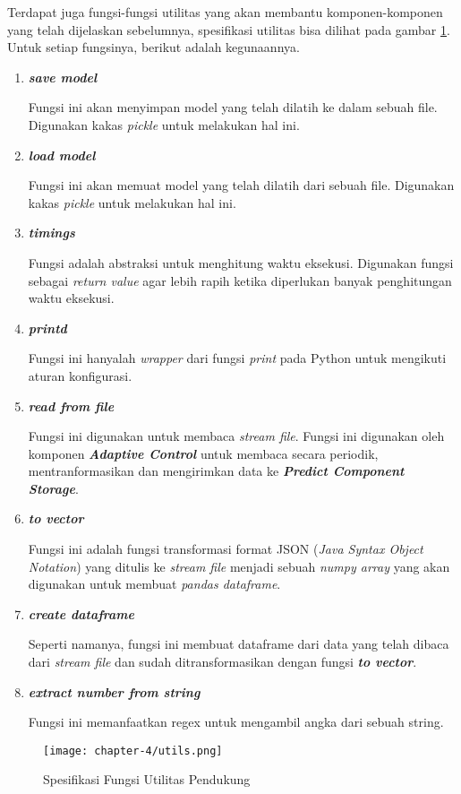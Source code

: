 Terdapat juga fungsi-fungsi utilitas yang akan membantu komponen-komponen yang telah dijelaskan sebelumnya, spesifikasi utilitas bisa dilihat pada gambar \ref{fig:util-spek}. Untuk setiap fungsinya, berikut adalah kegunaannya.

\begin{enumerate}
    \item \textbf{\textit{save model}}
    
    Fungsi ini akan menyimpan model yang telah dilatih ke dalam sebuah file. Digunakan kakas \textit{pickle} untuk melakukan hal ini.

    \item \textbf{\textit{load model}}
    
    Fungsi ini akan memuat model yang telah dilatih dari sebuah file. Digunakan kakas \textit{pickle} untuk melakukan hal ini.

    \item \textbf{\textit{timings}}
    
    Fungsi adalah abstraksi untuk menghitung waktu eksekusi. Digunakan fungsi sebagai \textit{return value} agar lebih rapih ketika diperlukan banyak penghitungan waktu eksekusi.

    \item \textbf{\textit{printd}}
    
    Fungsi ini hanyalah \textit{wrapper} dari fungsi \textit{print} pada Python untuk mengikuti aturan konfigurasi.

    \item \textbf{\textit{read from file}}
    
    Fungsi ini digunakan untuk membaca \textit{stream file}. Fungsi ini digunakan oleh komponen \textbf{\textit{Adaptive Control}} untuk membaca secara periodik, mentranformasikan dan mengirimkan data ke \textbf{\textit{Predict Component Storage}}.

    \item \textbf{\textit{to vector}}
    
    Fungsi ini adalah fungsi transformasi format JSON (\textit{Java Syntax Object Notation}) yang ditulis ke \textit{stream file} menjadi sebuah \textit{numpy array} yang akan digunakan untuk membuat \textit{pandas dataframe}.

    \item \textbf{\textit{create dataframe}}
    
    Seperti namanya, fungsi ini membuat dataframe dari data yang telah dibaca dari \textit{stream file} dan sudah ditransformasikan dengan fungsi \textbf{\textit{to vector}}.

    \item \textbf{\textit{extract number from string}}
    
    Fungsi ini memanfaatkan regex untuk mengambil angka dari sebuah string.
\end{enumerate}

\begin{figure}[h]
    \centering
    \texttt{[image: chapter-4/utils.png]}
    \caption{Spesifikasi Fungsi Utilitas Pendukung}
    \label{fig:util-spek}
\end{figure}

